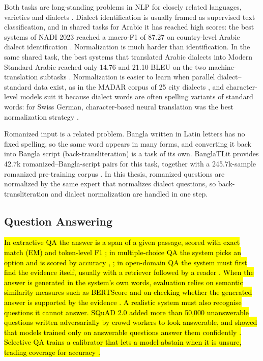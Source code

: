 Both tasks are long-standing problems in NLP for closely related
languages, varieties and dialects \cite{zampieri2020survey}. Dialect identification
is usually framed as supervised text classification, and in shared tasks
for Arabic it has reached high scores: the best systems of NADI 2023
reached a macro-F1 of 87.27 on country-level Arabic dialect
identification \cite{abdulmageed2023nadi}. Normalization is much harder than
identification. In the same shared task, the best systems that
translated Arabic dialects into Modern Standard Arabic reached only
14.76 and 21.10 BLEU on the two machine-translation subtasks
\cite{abdulmageed2023nadi}. Normalization is easier to learn when parallel
dialect--standard data exist, as in the MADAR corpus of 25 city
dialects \cite{bouamor2018madar}, and character-level models suit it because dialect
words are often spelling variants of standard words: for Swiss German,
character-based neural translation was the best normalization strategy
\cite{honnet2018swissgerman}.

Romanized input is a related problem. Bangla written in Latin letters
has no fixed spelling, so the same word appears in many forms, and
converting it back into Bangla script (back-transliteration) is a task
of its own. BanglaTLit provides 42.7k romanized--Bangla-script pairs for
this task, together with a 245.7k-sample romanized pre-training corpus
\cite{fahim2024banglatlit}. In this thesis, romanized questions are
normalized by the same expert that normalizes dialect questions, so
back-transliteration and dialect normalization are handled in one step.

\subsection{Question Answering}\label{question-answering}

\hl{In extractive QA the answer is a span of a given passage, scored
with exact match (EM) and token-level F1 \cite{ekram2022banglarqa}; in multiple-choice QA
the system picks an option and is scored by accuracy \cite{shafayat2024benqa}, \cite{shifa2025somajgyaan};
in open-domain QA the system must first find the evidence itself,
usually with a retriever followed by a reader \cite{karpukhin2020dpr}. When the answer
is generated in the system's own words, evaluation relies on semantic
similarity measures such as BERTScore \cite{zhang2020bertscore} and on checking whether
the generated answer is supported by the evidence \cite{es2024ragas}. A realistic
system must also recognise questions it cannot answer. SQuAD 2.0 added
more than 50,000 unanswerable questions written adversarially by crowd
workers to look answerable, and showed that models trained only on
answerable questions answer them confidently \cite{rajpurkar2018squad2}. Selective QA
trains a calibrator that lets a model abstain when it is unsure, trading
coverage for accuracy \cite{kamath2020selective}.}

